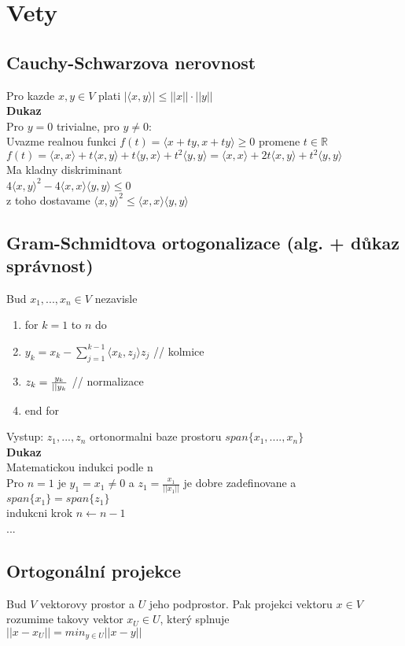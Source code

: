 \documentclass[a4paper]{article}
\begin{document}
\section*{Vety}
\subsection*{Cauchy-Schwarzova nerovnost}
Pro kazde $x,y \in V$ plati $|\langle x,y \rangle| \leq ||x|| \cdot ||y||$
\\
\textbf{Dukaz}\\
Pro $y=0$ trivialne, pro $y\neq0$:\\
Uvazme realnou funkci $f(t)=\langle x+ty,x+ty \rangle \geq 0$ promene $t\in\mathbb{R}$\\
$f(t)=\langle x,x \rangle + t\langle x,y \rangle + t\langle y,x \rangle + t^2\langle y,y \rangle=
\langle x,x \rangle + 2t \langle x,y \rangle + t^2 \langle y,y \rangle$\\
Ma kladny diskriminant\\
$4\langle x,y \rangle^2 - 4\langle x,x \rangle\langle y,y \rangle \leq 0$\\
z toho dostavame
$\langle x,y \rangle^2\leq\langle x,x \rangle\langle y,y \rangle$


\subsection*{Gram-Schmidtova ortogonalizace (alg. + důkaz správnost)}
Bud $x_1, ..., x_n \in V$ nezavisle\\
\begin{enumerate}
	\item for $k=1$ to $n$ do
	\item $y_k = x_k - \sum_{j=1}^{k-1}\langle x_k,z_j \rangle z_j$ // kolmice
	\item $z_k = \frac{y_k}{||y_k\\}$ // normalizace
	\item end for
\end{enumerate}
Vystup: $z_1, ...,z_n$ ortonormalni baze prostoru $span\{x_1, ...., x_n\}$\\
\textbf{Dukaz}\\
Matematickou indukci podle n\\
Pro $n=1$ je $y_1=x_1\neq 0$ a $z_1 = \frac{x_1}{||x_1||}$ je 
dobre zadefinovane a $span\{x_1\} = span\{z_1\}$\\
indukcni krok $n \gets n-1$\\
...


\subsection*{Ortogonální projekce}
Bud $V$ vektorovy prostor a $U$ jeho podprostor.
Pak projekci vektoru $x \in V$ rozumime takovy vektor $x_U \in U$,
který splnuje\\
$||x - x_U|| = min_{y\in U} ||x - y||$
\end{document}
